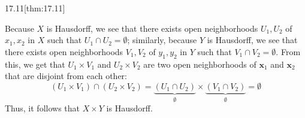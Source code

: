 \begin{thmBox}{17.11}[thm:17.11]
\begin{proofBox}
        \baseSkip 

        Because \( X \) is Hausdorff, we see that there exists 
        open neighborhoods \( U_{ 1 }, U_{ 2 } \) of \( x_{ 1 }, x_{ 2 } \) in 
        \( X \) such that \( U_{ 1 } \cap U_{ 2 } = \emptyset \); similarly, 
        because \( Y \) is Hausdorff, we see that there exists 
        open neighborhoods \( V_{ 1 }, V_{ 2 } \) of \( y_{ 1 }, y_{ 2 } \) in 
        \( Y \) such that \( V_{ 1 } \cap V_{ 2 } = \emptyset \).
        From this, we get that \( U_{ 1 } \times V_{ 1 } \) and \( U_{ 2 } 
        \times V_{ 2 } \) are two open neighborhoods of \( \mathbf{x}_{ 1 } \) 
        and \( \mathbf{x}_{ 2 } \) that are disjoint from each other:
        \begin{equation*}
            ( U_{ 1 } \times V_{ 1 } ) \cap ( U_{ 2 } \times V_{ 2 } )
            =
            \underbrace{ ( U_{ 1 } \cap U_{ 2 } ) }_{ \emptyset }
            \times 
            \underbrace{ ( V_{ 1 } \cap V_{ 2 } ) }_{ \emptyset }
            =
            \emptyset
        \end{equation*}
        Thus, it follows that \( X \times Y \) is Hausdorff.
    \end{proofBox}
\end{thmBox}